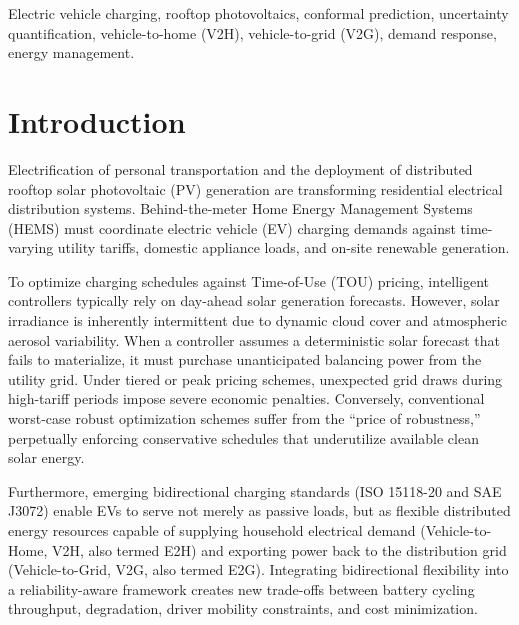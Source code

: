 \documentclass[conference]{IEEEtran}
\begin{document}
\begin{abstract}
midnight hours. Stress testing across synthetic forecast-error regimes confirms that the reliability-aware switching controller reliably mitigates forecast-induced cost deviations.
\end{abstract}

\begin{IEEEkeywords}
Electric vehicle charging, rooftop photovoltaics, conformal prediction, uncertainty quantification, vehicle-to-home (V2H), vehicle-to-grid (V2G), demand response, energy management.
\end{IEEEkeywords}

\section{Introduction}
Electrification of personal transportation and the deployment of distributed rooftop solar photovoltaic (PV) generation are transforming residential electrical distribution systems. Behind-the-meter Home Energy Management Systems (HEMS) must coordinate electric vehicle (EV) charging demands against time-varying utility tariffs, domestic appliance loads, and on-site renewable generation.

To optimize charging schedules against Time-of-Use (TOU) pricing, intelligent controllers typically rely on day-ahead solar generation forecasts. However, solar irradiance is inherently intermittent due to dynamic cloud cover and atmospheric aerosol variability. When a controller assumes a deterministic solar forecast that fails to materialize, it must purchase unanticipated balancing power from the utility grid. Under tiered or peak pricing schemes, unexpected grid draws during high-tariff periods impose severe economic penalties. Conversely, conventional worst-case robust optimization schemes suffer from the ``price of robustness,'' perpetually enforcing conservative schedules that underutilize available clean solar energy.

Furthermore, emerging bidirectional charging standards (ISO 15118-20 and SAE J3072) enable EVs to serve not merely as passive loads, but as flexible distributed energy resources capable of supplying household electrical demand (Vehicle-to-Home, V2H, also termed E2H) and exporting power back to the distribution grid (Vehicle-to-Grid, V2G, also termed E2G). Integrating bidirectional flexibility into a reliability-aware framework creates new trade-offs between battery cycling throughput, degradation, driver mobility constraints, and cost minimization.
\end{document}
